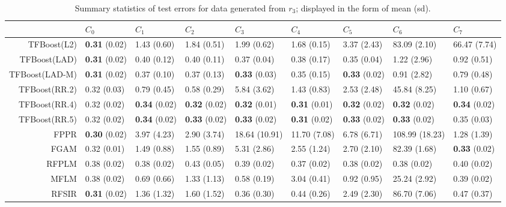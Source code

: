 \begin{table}[H]
\centering
\begin{tabular}{rllllllll}
  \hline
 & $C_0$ & $C_1$ & $C_2$ & $C_3$ & $C_4$ & $C_5$ & $C_6$ & $C_7$ \\ 
  \hline
TFBoost(L2) & \textbf{0.31} (0.02) & 1.43 (0.60) & 1.84 (0.51) & 1.99 (0.62) & 1.68 (0.15) & 3.37 (2.43) & 83.09 (2.10) & 66.47 (7.74) \\ 
  TFBoost(LAD) & \textbf{0.31} (0.02) & 0.40 (0.12) & 0.40 (0.11) & 0.37 (0.04) & 0.38 (0.17) & 0.35 (0.04) & 1.22 (2.96) & 0.92 (0.51) \\ 
  TFBoost(LAD-M) & \textbf{0.31} (0.02) & 0.37 (0.10) & 0.37 (0.13) & \textbf{0.33} (0.03) & 0.35 (0.15) & \textbf{0.33} (0.02) & 0.91 (2.82) & 0.79 (0.48) \\ 
  TFBoost(RR.2) & 0.32 (0.03) & 0.79 (0.45) & 0.58 (0.29) & 5.84 (3.62) & 1.43 (0.83) & 2.53 (2.48) & 45.84 (8.25) & 1.10 (0.67) \\ 
  TFBoost(RR.4) & 0.32 (0.02) & \textbf{0.34} (0.02) & \textbf{0.32} (0.02) & \textbf{0.32} (0.01) & \textbf{0.31} (0.01) & \textbf{0.32} (0.02) & \textbf{0.32} (0.02) & \textbf{0.34} (0.02) \\ 
  TFBoost(RR.5) & 0.32 (0.02) & \textbf{0.34} (0.02) & \textbf{0.33} (0.02) & \textbf{0.33} (0.02) & \textbf{0.31} (0.02) & \textbf{0.33} (0.02) & \textbf{0.33} (0.02) & 0.35 (0.03) \\ 
  FPPR & \textbf{0.30} (0.02) & 3.97 (4.23) & 2.90 (3.74) & 18.64 (10.91) & 11.70 (7.08) & 6.78 (6.71) & 108.99 (18.23) & 1.28 (1.39) \\ 
  FGAM & 0.32 (0.01) & 1.49 (0.88) & 1.55 (0.89) & 5.31 (2.86) & 2.55 (1.24) & 2.70 (2.10) & 82.39 (1.68) & \textbf{0.33} (0.02) \\ 
  RFPLM & 0.38 (0.02) & 0.38 (0.02) & 0.43 (0.05) & 0.39 (0.02) & 0.37 (0.02) & 0.38 (0.02) & 0.38 (0.02) & 0.40 (0.02) \\ 
  MFLM & 0.38 (0.02) & 0.69 (0.66) & 1.33 (1.13) & 0.58 (0.19) & 3.04 (0.41) & 0.92 (0.95) & 25.24 (2.92) & 0.39 (0.02) \\ 
  RFSIR & \textbf{0.31} (0.02) & 1.36 (1.32) & 1.60 (1.52) & 0.36 (0.30) & 0.44 (0.26) & 2.49 (2.30) & 86.70 (7.06) & 0.47 (0.37) \\ 
   \hline
\end{tabular}
\caption{Summary statistics of test errors for data generated from $r_3$; displayed in the form of mean (sd).} 
\end{table}
